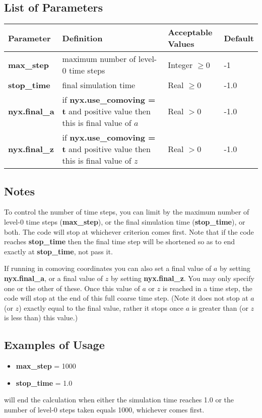 \subsection{List of Parameters}
\begin{table*}[h]
\begin{scriptsize}
\begin{center}
\begin{tabular}{|l|l|l|l|} \hline
Parameter & Definition & Acceptable Values &Default \\
\hline
{\bf max\_step}  & maximum number of level-0 time steps & Integer $\geq 0$ & -1 \\
{\bf stop\_time} & final simulation time & Real $\geq 0$ & -1.0 \\
{\bf nyx.final\_a}   & if {\bf nyx.use\_comoving = t} and positive value then this is final value of $a$  & Real $> 0$ & -1.0 \\
{\bf nyx.final\_z}   & if {\bf nyx.use\_comoving = t} and positive value then this is final value of $z$  & Real $> 0$ & -1.0 \\
\hline
\end{tabular}
\label{Table:TimeInputs}
\end{center}
\end{scriptsize}
\end{table*}

\subsection{Notes}
To control the number of time steps, you can limit by the maximum number of 
level-0 time steps ({\bf max\_step}), or the final simulation time ({\bf stop\_time}), 
or both. The code will stop at whichever criterion comes first. 
Note that if the code reaches {\bf stop\_time} then the final time step will be shortened so as to end 
exactly at {\bf stop\_time}, not pass it.

If running in comoving coordinates you can also set 
a final value of $a$ by setting {\bf nyx.final\_a}, 
or a final value of $z$ by setting {\bf nyx.final\_z}.
You may only specify one or the other of these.
Once this value of $a$ or $z$ is reached in a time step, 
the code will stop at the end of this full coarse time step.  
(Note it does not stop at $a$ (or $z$) exactly equal to the final value, 
rather it stops once $a$ is greater than (or $z$ is less than) this value.)


\subsection{Examples of Usage}
\begin{itemize}
\item {\bf max\_step}  = 1000
\item {\bf stop\_time}  = 1.0
\end{itemize}
will end the calculation when either the simulation time reaches 1.0 or 
the number of level-0 steps taken equals 1000, whichever comes first.

